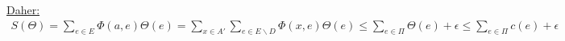 \underline{Daher:}
\begin{align}
	S(\Theta) = \sum\limits_{e \in E} \Phi(a,e) \Theta(e)  = \sum\limits_{x \in A'}\sum\limits_{e \in E\backslash D} \Phi(x,e) \Theta(e) \leq \sum\limits_{e \in \Pi} \Theta(e) + \epsilon \leq \sum\limits_{e \in \Pi} c(e) + \epsilon
\end{align}





